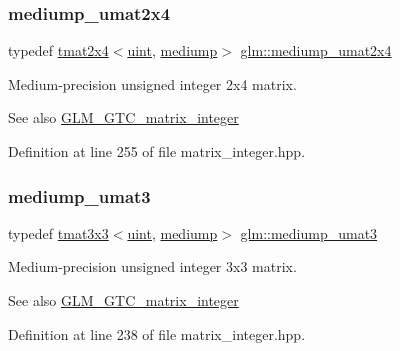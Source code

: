 \subsubsection{\texorpdfstring{mediump\_umat2x4}{mediump\_umat2x4}}
{\footnotesize\ttfamily typedef \mbox{\hyperlink{structglm_1_1tmat2x4}{tmat2x4}}$<$\mbox{\hyperlink{group__core__precision_ga4fd29415871152bfb5abd588334147c8}{uint}}, \mbox{\hyperlink{namespaceglm_a0f04f086094c747d227af4425893f545a6416f3ea0c9025fb21ed50c4d6620482}{mediump}}$>$ \mbox{\hyperlink{group__gtc__matrix__integer_ga972445669c6e6652716f3f0b664b94cd}{glm\+::mediump\+\_\+umat2x4}}}

Medium-\/precision unsigned integer 2x4 matrix. \begin{DoxySeeAlso}{See also}
\mbox{\hyperlink{group__gtc__matrix__integer}{G\+L\+M\+\_\+\+G\+T\+C\+\_\+matrix\+\_\+integer}} 
\end{DoxySeeAlso}


Definition at line 255 of file matrix\+\_\+integer.\+hpp.

\mbox{\label{group__gtc__matrix__integer_ga953d4cb3e70d85567756b3fbcca0e9e9}} 
\subsubsection{\texorpdfstring{mediump\_umat3}{mediump\_umat3}}
{\footnotesize\ttfamily typedef \mbox{\hyperlink{structglm_1_1tmat3x3}{tmat3x3}}$<$\mbox{\hyperlink{group__core__precision_ga4fd29415871152bfb5abd588334147c8}{uint}}, \mbox{\hyperlink{namespaceglm_a0f04f086094c747d227af4425893f545a6416f3ea0c9025fb21ed50c4d6620482}{mediump}}$>$ \mbox{\hyperlink{group__gtc__matrix__integer_ga953d4cb3e70d85567756b3fbcca0e9e9}{glm\+::mediump\+\_\+umat3}}}

Medium-\/precision unsigned integer 3x3 matrix. \begin{DoxySeeAlso}{See also}
\mbox{\hyperlink{group__gtc__matrix__integer}{G\+L\+M\+\_\+\+G\+T\+C\+\_\+matrix\+\_\+integer}} 
\end{DoxySeeAlso}


Definition at line 238 of file matrix\+\_\+integer.\+hpp.

\mbox{\label{group__gtc__matrix__integer_ga62243caa5b85b1cf91021ce6ffc21183}} 
